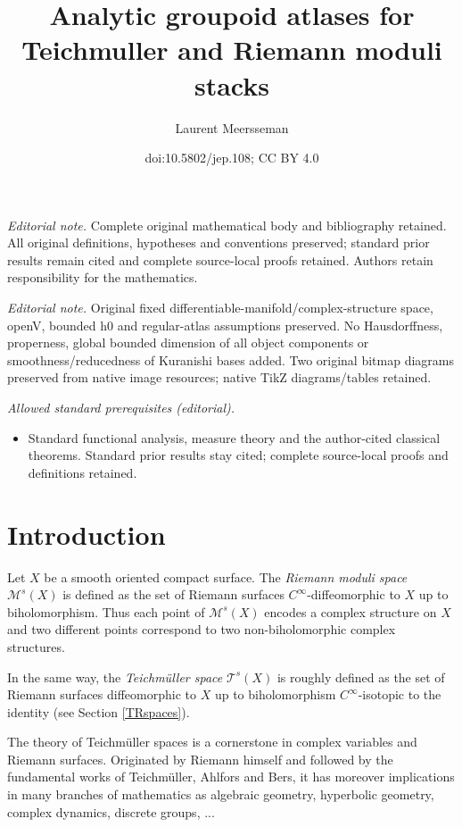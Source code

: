 \documentclass[10pt]{amsart}
\title{Analytic groupoid atlases for Teichmuller and Riemann moduli stacks}
\author{Laurent Meersseman}
\date{doi:10.5802/jep.108; CC BY 4.0}
\let\mathcal\mathscr
\theoremstyle{plain}
\theoremstyle{definition}
\theoremstyle{remark}
\numberwithin{equation}{section}
\providecommand{\mainmatter}{}\providecommand{\backmatter}{}
\begin{document}
\maketitle
\noindent\textit{Editorial note.} Complete original mathematical body and bibliography retained. All original definitions, hypotheses and conventions preserved; standard prior results remain cited and complete source-local proofs retained. Authors retain responsibility for the mathematics.\par\medskip
\noindent\textit{Editorial note.} Original fixed differentiable-manifold/complex-structure space, openV, bounded h0 and regular-atlas assumptions preserved. No Hausdorffness, properness, global bounded dimension of all object components or smoothness/reducedness of Kuranishi bases added. Two original bitmap diagrams preserved from native image resources; native TikZ diagrams/tables retained.\par\medskip
\noindent\textit{Allowed standard prerequisites (editorial).}\begin{itemize}
\item Standard functional analysis, measure theory and the author-cited classical theorems. Standard prior results stay cited; complete source-local proofs and definitions retained.
\end{itemize}\medskip
\tableofcontents
\mainmatter

\section{Introduction}
\label{intro}
Let $X$ be a smooth oriented compact surface. The \emph{Riemann moduli space} $\mathcal M^s(X)$ is defined as the set of Riemann surfaces $C^\infty$-diffeomorphic to $X$ up to biholomorphism. Thus each point of $\mathcal M^s(X)$ encodes a complex structure on $X$ and two different points correspond to two non-biholomorphic complex structures.

In the same way, the \emph{Teichmüller space} $\mathcal T^s(X)$ is roughly defined as the set of \hbox{Riemann} surfaces diffeomorphic to $X$ up to biholomorphism $C^\infty$-isotopic to the identity (see Section \ref{TRspaces}).

The theory of Teichmüller spaces is a cornerstone in complex variables and Riemann surfaces. Originated by Riemann himself and followed by the fundamental works of Teichmüller, Ahlfors and Bers, it has moreover implications in many branches of mathematics as algebraic geometry, hyperbolic geometry, complex dynamics, discrete groups, ...
\end{document}
